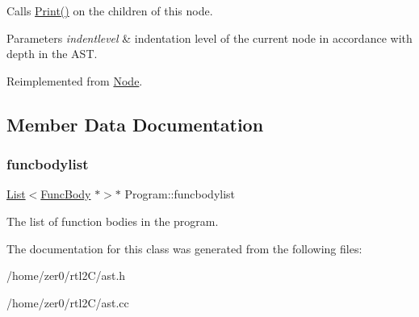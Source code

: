 Calls \hyperlink{class_node_a9ef727fd72d1a37792b3db60a8a479dd}{Print()} on the children of this node. 
\begin{DoxyParams}{Parameters}
{\em indentlevel} & indentation level of the current node in accordance with depth in the A\+ST. \\
\hline
\end{DoxyParams}


Reimplemented from \hyperlink{class_node_a3e67ec8d22182b721717af14fe0c3000}{Node}.



\subsection{Member Data Documentation}
\mbox{\label{class_program_ab1c6f9b96b35cf94504ed2aa30cfb692}} 
\subsubsection{\texorpdfstring{funcbodylist}{funcbodylist}}
{\footnotesize\ttfamily \hyperlink{class_list}{List}$<$\hyperlink{class_func_body}{Func\+Body} $\ast$$>$$\ast$ Program\+::funcbodylist\hspace{0.3cm}{\ttfamily [protected]}}

The list of function bodies in the program. 

The documentation for this class was generated from the following files\+:\begin{DoxyCompactItemize}
\item 
/home/zer0/rtl2\+C/ast.\+h\item 
/home/zer0/rtl2\+C/ast.\+cc\end{DoxyCompactItemize}

